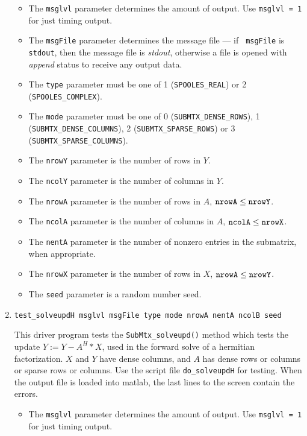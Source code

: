 \begin{enumerate}
\begin{itemize}
\item
The {\tt msglvl} parameter determines the amount of output.
Use {\tt msglvl = 1} for just timing output.
\item
The {\tt msgFile} parameter determines the message file --- if {\tt
msgFile} is {\tt stdout}, then the message file is {\it stdout},
otherwise a file is opened with {\it append} status to receive any
output data.
\item
The {\tt type} parameter must be one of 1 ({\tt SPOOLES\_REAL})
or 2 ({\tt SPOOLES\_COMPLEX}). 
\item
The {\tt mode} parameter must be one of
0 ({\tt SUBMTX\_DENSE\_ROWS}),
1 ({\tt SUBMTX\_DENSE\_COLUMNS}),
2 ({\tt SUBMTX\_SPARSE\_ROWS}) or
3 ({\tt SUBMTX\_SPARSE\_COLUMNS}).
\item
The {\tt nrowY} parameter is the number of rows in $Y$.
\item
The {\tt ncolY} parameter is the number of columns in $Y$.
\item
The {\tt nrowA} parameter is the number of rows in $A$,
${\tt nrowA} \le {\tt nrowY}$.
\item
The {\tt ncolA} parameter is the number of columns in $A$,
${\tt ncolA} \le {\tt nrowX}$.
\item
The {\tt nentA} parameter is the number of nonzero entries in the
submatrix, when appropriate.
\item
The {\tt nrowX} parameter is the number of rows in $X$,
${\tt nrowA} \le {\tt nrowY}$.
\item
The {\tt seed} parameter is a random number seed.
\end{itemize}
\item
\begin{verbatim}
test_solveupdH msglvl msgFile type mode nrowA nentA ncolB seed
\end{verbatim}
This driver program tests 
the {\tt SubMtx\_solveupd()} method
which tests the update $Y := Y - A^H * X$,
used in the forward solve of a hermitian factorization.
$X$ and $Y$ have dense columns,
and $A$ has dense rows or columns or sparse rows or columns.
Use the script file {\tt do\_solveupdH} for testing.
When the output file is loaded into matlab,
the last lines to the screen contain the errors.
\par
\begin{itemize}
\item
The {\tt msglvl} parameter determines the amount of output.
Use {\tt msglvl = 1} for just timing output.

\end{itemize}
\end{enumerate}
